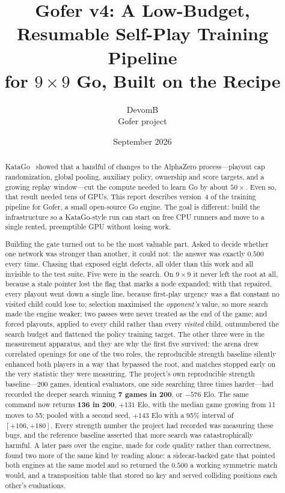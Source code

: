 \documentclass[11pt]{article}
\title{Gofer v4: A Low-Budget, Resumable Self-Play Training Pipeline\\for $9\times9$ Go, Built on the \katago{} Recipe}
\author{DevomB\\\small Gofer project}
\date{September 2026}
\newcommand{\gofer}{Gofer}
\newcommand{\katago}{KataGo}
\begin{document}
\maketitle

\begin{abstract}
\katago{}~\citep{wu2019accelerating} showed that a handful of changes to the AlphaZero
process---playout cap randomization, global pooling, auxiliary policy, ownership and score
targets, and a growing replay window---cut the compute needed to learn Go by about
$50\times$. Even so, that result needed tens of GPUs. This report describes version~4 of the
training pipeline for \gofer{}, a small open-source Go engine. The goal is different: build
the infrastructure so a \katago{}-style run can start on free CPU runners and move to a
single rented, preemptible GPU without losing work.

Building the gate turned out to be the most valuable part. Asked to decide whether one
network was stronger than another, it could not: the answer was exactly $0.500$ every
time. Chasing that exposed eight defects, all older than this work and all invisible to
the test suite. Five were in the search. On $9\times9$ it never left the root at all,
because a stale pointer lost the flag that marks a node expanded; with that repaired,
every playout went down a single line, because first-play urgency was a flat constant no
visited child could lose to; selection maximised the \emph{opponent's} value, so more
search made the engine weaker; two passes were never treated as the end of the game; and
forced playouts, applied to every child rather than every \emph{visited} child,
outnumbered the search budget and flattened the policy training target. The other three
were in the measurement apparatus, and they are why the first five survived: the arena
drew correlated openings for one of the two roles, the reproducible strength baseline
silently enhanced both players in a way that bypassed the root, and matches stopped early
on the very statistic they were measuring. The project's own reproducible strength
baseline---200 games, identical evaluators, one side searching three times harder---had
recorded the deeper search winning \textbf{7 games in 200}, or $-576$ Elo. The same
command now returns \textbf{136 in 200}, $+131$ Elo, with the median game growing from 11
moves to 55; pooled with a second seed, $+143$ Elo with a 95\% interval of $[+106, +180]$. Every strength number the project had recorded was measuring these bugs, and
the reference baseline asserted that more search was catastrophically harmful. A later
pass over the engine, made for code quality rather than correctness, found two more of the
same kind by reading alone: a sidecar-backed gate that pointed both engines at the same
model and so returned the $0.500$ a working symmetric match would, and a transposition
table that stored no key and served colliding positions each other's evaluations.


\end{abstract}
\end{document}
